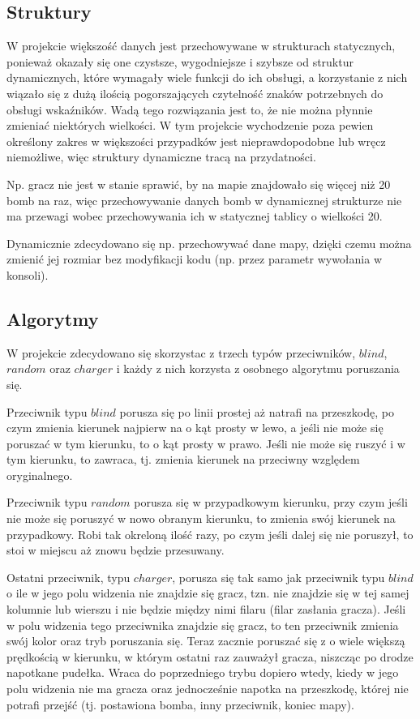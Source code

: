 \documentclass[12pt,a4paper]{article}
\begin{document}
\subsection {Struktury}
W projekcie większość danych jest przechowywane w strukturach statycznych, ponieważ okazały się one czystsze, wygodniejsze i szybsze od struktur dynamicznych, które wymagały wiele funkcji do ich obsługi, a korzystanie z nich wiązało się z dużą ilością pogorszających czytelność znaków potrzebnych do obsługi wskaźników. Wadą tego rozwiązania jest to, że nie można płynnie zmieniać niektórych wielkości. W tym projekcie wychodzenie poza pewien określony zakres w większości przypadków jest nieprawdopodobne lub wręcz niemożliwe, więc struktury dynamiczne tracą na przydatności. 

Np. gracz nie jest w stanie sprawić, by na mapie znajdowało się więcej niż 20 bomb na raz, więc przechowywanie danych bomb w dynamicznej strukturze nie ma przewagi wobec przechowywania ich w statycznej tablicy o wielkości 20.

Dynamicznie zdecydowano się np. przechowywać dane mapy, dzięki czemu można zmienić jej rozmiar bez modyfikacji kodu (np. przez parametr wywołania w konsoli).
\subsection{Algorytmy}
W projekcie zdecydowano się skorzystac z trzech typów przeciwników, $blind$, $random$ oraz $charger$ i każdy z nich korzysta z osobnego algorytmu poruszania się.

Przeciwnik typu $blind$ porusza się po linii prostej aż natrafi na przeszkodę, po czym zmienia kierunek najpierw na o kąt prosty w lewo, a jeśli nie może się poruszać w tym kierunku, to o kąt prosty w prawo. Jeśli nie może się  ruszyć i w tym kierunku, to zawraca, tj. zmienia kierunek na przeciwny względem oryginalnego.

Przeciwnik typu $random$ porusza się w przypadkowym kierunku, przy czym jeśli nie może się poruszyć w nowo obranym kierunku, to zmienia swój kierunek na przypadkowy. Robi tak okreloną ilość razy, po czym jeśli dalej się nie poruszył, to stoi w miejscu aż znowu będzie przesuwany.

Ostatni przeciwnik, typu $charger$, porusza się tak samo jak przeciwnik typu $blind$ o ile w jego polu widzenia nie znajdzie się gracz, tzn. nie znajdzie się w tej samej kolumnie lub wierszu i nie będzie między nimi filaru (filar zasłania gracza). Jeśli w polu widzenia tego przeciwnika znajdzie się gracz, to ten przeciwnik zmienia swój kolor oraz tryb poruszania się. Teraz zacznie poruszać się z o wiele większą prędkością w kierunku, w którym ostatni raz zauważył gracza, niszcząc po drodze napotkane pudełka. Wraca do poprzedniego trybu dopiero wtedy, kiedy w jego polu widzenia nie ma gracza oraz jednocześnie napotka na przeszkodę, której nie potrafi przejść (tj. postawiona bomba, inny przeciwnik, koniec mapy).
\end{document}
